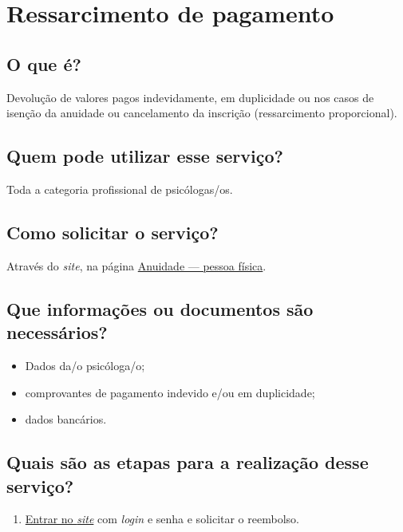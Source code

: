 \chapter{Ressarcimento de pagamento}
\label{chap:pf-ressarcimento}

\section{O que é?}

Devolução de valores pagos indevidamente, em duplicidade ou nos casos de isenção da anuidade ou cancelamento da inscrição (ressarcimento proporcional).

\section{Quem pode utilizar esse serviço?}

Toda a categoria profissional de psicólogas/os.

\section{Como solicitar o serviço?}

Através do \emph{site}, na página \href{https://www.crpsp.org/pagina/view/27/anuidade-pessoa-fisica}{Anuidade --- pessoa física}.

\section{Que informações ou documentos são necessários?}

\begin{itemize}
  \item  Dados da/o psicóloga/o;
  \item  comprovantes de pagamento indevido e/ou em duplicidade;
  \item  dados bancários.
\end{itemize}

\section{Quais são as etapas para a realização desse serviço?}

\begin{enumerate}
  \item  \href{https://cfpsp.brctotal.com/crp06_servicosonline/pgsRequerimento/SelecionaRequerimento.aspx}{Entrar  no \emph{site}} com \emph{login} e senha e solicitar o reembolso.
\end{enumerate}

